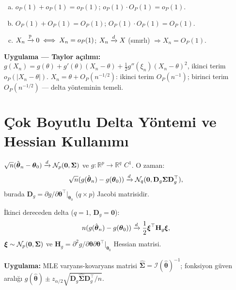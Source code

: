 \begin{teorem}\label{app:thm:op_algebra}
\begin{enumerate}[(a)]
  \item $o_P(1)+o_P(1)=o_P(1)$; $o_P(1)\cdot O_P(1)=o_P(1)$.
  \item $O_P(1)+O_P(1)=O_P(1)$; $O_P(1)\cdot O_P(1)=O_P(1)$.
  \item $X_n\xrightarrow{\mathbb{P}}0\iff X_n=o_P(1)$; $X_n\xrightarrow{d} X$ (sınırlı) $\Rightarrow X_n=O_P(1)$.
\end{enumerate}
\end{teorem}

\noindent\textbf{Uygulama — Taylor açılımı:}
$g(X_n)=g(\theta)+g'(\theta)(X_n-\theta)+\frac12g''(\xi_n)(X_n-\theta)^2$, ikinci terim $o_P(|X_n-\theta|)$.
$X_n=\theta+O_P(n^{-1/2})$: ikinci terim $O_P(n^{-1})$; birinci terim $O_P(n^{-1/2})$ — delta yönteminin temeli.

\section{Çok Boyutlu Delta Yöntemi ve Hessian Kullanımı}
\label{app:delta_cok}

\begin{teorem}\label{app:thm:delta_cok}
$\sqrt{n}(\hat{\boldsymbol\theta}_n-\boldsymbol\theta_0)\xrightarrow{d}\mathcal{N}_p(\mathbf{0},\boldsymbol\Sigma)$ ve $g:\mathbb{R}^p\to\mathbb{R}^q$ $C^1$. O zaman:
\[
  \sqrt{n}(g(\hat{\boldsymbol\theta}_n)-g(\boldsymbol\theta_0))\xrightarrow{d}\mathcal{N}_q(\mathbf{0},\mathbf{D}_g\boldsymbol\Sigma\mathbf{D}_g^\top),
\]
burada $\mathbf{D}_g=\partial g/\partial\boldsymbol\theta^\top\big|_{\boldsymbol\theta_0}$ ($q\times p$) Jacobi matrisidir.

İkinci dereceden delta ($q=1$, $\mathbf{D}_g=\mathbf{0}$):
\[
  n(g(\hat{\boldsymbol\theta}_n)-g(\boldsymbol\theta_0))\xrightarrow{d}\frac12\boldsymbol\xi^\top\mathbf{H}_g\boldsymbol\xi,
\]
$\boldsymbol\xi\sim\mathcal{N}_p(\mathbf{0},\boldsymbol\Sigma)$ ve $\mathbf{H}_g=\partial^2g/\partial\boldsymbol\theta\partial\boldsymbol\theta^\top|_{\boldsymbol\theta_0}$ Hessian matrisi.
\end{teorem}

\noindent\textbf{Uygulama:} MLE varyans-kovaryans matrisi $\hat{\boldsymbol\Sigma}=\mathcal{I}(\hat{\boldsymbol\theta})^{-1}$; fonksiyon güven aralığı $g(\hat{\boldsymbol\theta})\pm z_{\alpha/2}\sqrt{\mathbf{D}_g\hat{\boldsymbol\Sigma}\mathbf{D}_g^\top/n}$.
